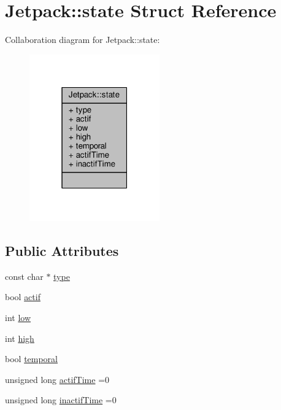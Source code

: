 \hypertarget{structJetpack_1_1state}{}\section{Jetpack\+:\+:state Struct Reference}
\label{structJetpack_1_1state}


Collaboration diagram for Jetpack\+:\+:state\+:
\nopagebreak
\begin{figure}[H]
\begin{center}
\leavevmode
\includegraphics[width=159pt]{structJetpack_1_1state__coll__graph}
\end{center}
\end{figure}
\subsection*{Public Attributes}
\begin{DoxyCompactItemize}
\item 
const char $\ast$ \hyperlink{structJetpack_1_1state_a59e307555493f5a64f87ac4c63943371}{type}
\item 
bool \hyperlink{structJetpack_1_1state_aa177541689bbaea21a4650a083b0df77}{actif}
\item 
int \hyperlink{structJetpack_1_1state_ace3ecd2b1f262756d8f7a8adda20136a}{low}
\item 
int \hyperlink{structJetpack_1_1state_a54cc9291c7cc30102a07fd2b0ccd8dde}{high}
\item 
bool \hyperlink{structJetpack_1_1state_abd6039e7a48856550b0ffbf8bcff7bdd}{temporal}
\item 
unsigned long \hyperlink{structJetpack_1_1state_af2e1cc323ef9ffcc3cf4d203f85d726b}{actif\+Time} =0
\item 
unsigned long \hyperlink{structJetpack_1_1state_aaf817b1f9e7a4d65b9e3ca4726b281f6}{inactif\+Time} =0
\end{DoxyCompactItemize}


